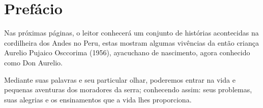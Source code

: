 \cleardoublepage
\newpage
\thispagestyle{empty}
\vfill


\chapter*{Prefácio} %

Nas próximas páginas, o leitor conhecerá um conjunto de histórias acontecidas na cordilheira dos Andes no Peru, estas mostram algumas vivências da então criança Aurelio Pujaico Osccorima (1956), %
ayacuchano de nascimento,
agora conhecido como Don Aurelio.

Mediante suas palavras e seu particular olhar, poderemos entrar na vida e pequenas aventuras dos moradores da serra; conhecendo assim: seus problemas, suas alegrias e os ensinamentos que a vida lhes proporciona. 
\vfill

\newpage
\thispagestyle{empty}
